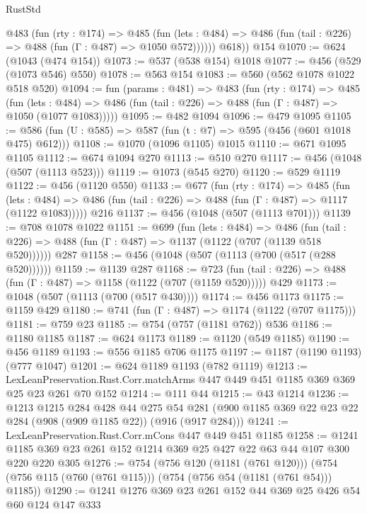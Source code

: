 \begin{lexlean}{RustStd}
\begin{coremodule}
          @483
            (fun (rty : @174) =>
            @485
              (fun (lets : @484) =>
              @486 (fun (tail : @226) => @488 (fun (Γ : @487) => @1050 @572))))))
        @618))
    @154
@1070 := @624 (@1043 (@474 @154))
@1073 := @537 (@538 @154) @1018
@1077 := @456 (@529 (@1073 @546) @550)
@1078 := @563 @154
@1083 := @560 (@562 @1078 @1022 @518 @520)
@1094 := fun (params : @481) =>
  @483
    (fun (rty : @174) =>
    @485
      (fun (lets : @484) =>
      @486 (fun (tail : @226) => @488 (fun (Γ : @487) => @1050 (@1077 @1083)))))
@1095 := @482 @1094
@1096 := @479 @1095
@1105 := @586 (fun (U : @585) => @587 (fun (t : @7) => @595 (@456 (@601 @1018 @475) @612)))
@1108 := @1070 (@1096 @1105) @1015
@1110 := @671 @1095 @1105
@1112 := @674 @1094 @270
@1113 := @510 @270
@1117 := @456 (@1048 (@507 (@1113 @523)))
@1119 := @1073 (@545 @270)
@1120 := @529 @1119
@1122 := @456 (@1120 @550)
@1133 := @677
    (fun (rty : @174) =>
    @485
      (fun (lets : @484) =>
      @486 (fun (tail : @226) => @488 (fun (Γ : @487) => @1117 (@1122 @1083)))))
    @216
@1137 := @456 (@1048 (@507 (@1113 @701)))
@1139 := @708 @1078 @1022
@1151 := @699
    (fun (lets : @484) =>
    @486 (fun (tail : @226) => @488 (fun (Γ : @487) => @1137 (@1122 (@707 (@1139 @518 @520))))))
    @287
@1158 := @456 (@1048 (@507 (@1113 (@700 (@517 (@288 @520))))))
@1159 := @1139 @287
@1168 := @723 (fun (tail : @226) => @488 (fun (Γ : @487) => @1158 (@1122 (@707 (@1159 @520))))) @429
@1173 := @1048 (@507 (@1113 (@700 (@517 @430))))
@1174 := @456 @1173
@1175 := @1159 @429
@1180 := @741 (fun (Γ : @487) => @1174 (@1122 (@707 @1175)))
@1181 := @759 @23
@1185 := @754 (@757 (@1181 @762)) @536
@1186 := @1180 @1185
@1187 := @624 @1173
@1189 := @1120 (@549 @1185)
@1190 := @456 @1189
@1193 := @556 @1185 @706 @1175
@1197 := @1187 (@1190 @1193) (@777 @1047)
@1201 := @624 @1189 @1193 (@782 @1119)
@1213 := LexLeanPreservation.Rust.Corr.matchArms
    @447
    @449
    @451
    @1185
    @369
    @369
    @25
    @23
    @261
    @70
    @152
@1214 := @111 @44
@1215 := @43 @1214
@1236 := @1213
    @1215
    @284
    @428
    @44
    @275
    @54
    @281
    (@900 @1185 @369 @22 @23 @22 @284 (@908 (@909 @1185 @22)) (@916 (@917 @284)))
@1241 := LexLeanPreservation.Rust.Corr.mCons @447 @449 @451 @1185
@1258 := @1241 @1185 @369 @23 @261 @152 @1214 @369 @25 @427 @22 @63 @44 @107 @300 @220 @220 @305
@1276 := @754
    (@756 @120 (@1181 (@761 @120)))
    (@754 (@756 @115 (@760 (@761 @115))) (@754 (@756 @54 (@1181 (@761 @54))) @1185))
@1290 := @1241 @1276 @369 @23 @261 @152 @44 @369 @25 @426 @54 @60 @124 @147 @333

\end{coremodule}
\end{lexlean}
